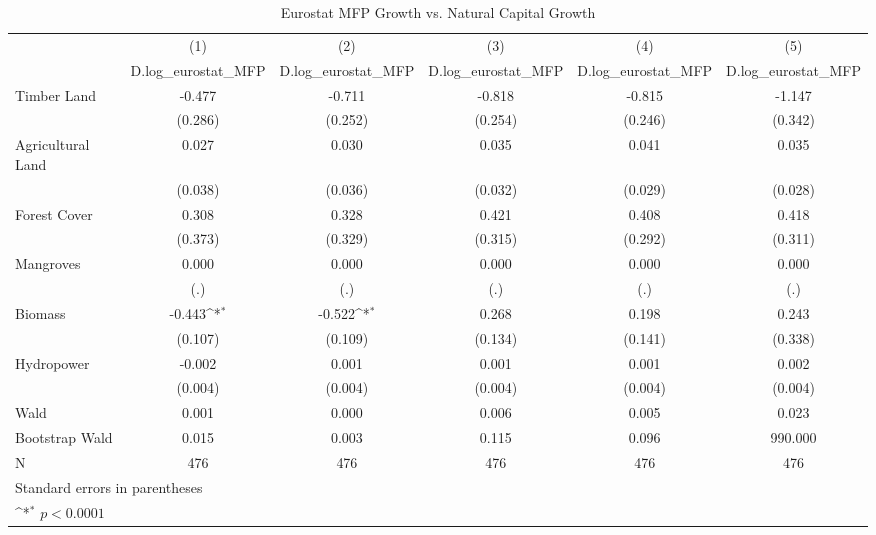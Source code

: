\begin{table}[htbp]\centering
\def\sym#1{\ifmmode^{#1}\else\(^{#1}\)\fi}
\caption{Eurostat MFP Growth vs. Natural Capital Growth}
\begin{tabular}{l*{5}{c}}
\hline\hline
            &\multicolumn{1}{c}{(1)}&\multicolumn{1}{c}{(2)}&\multicolumn{1}{c}{(3)}&\multicolumn{1}{c}{(4)}&\multicolumn{1}{c}{(5)}\\
            &\multicolumn{1}{c}{D.log\_eurostat\_MFP}&\multicolumn{1}{c}{D.log\_eurostat\_MFP}&\multicolumn{1}{c}{D.log\_eurostat\_MFP}&\multicolumn{1}{c}{D.log\_eurostat\_MFP}&\multicolumn{1}{c}{D.log\_eurostat\_MFP}\\
\hline
Timber Land &      -0.477       &      -0.711       &      -0.818       &      -0.815       &      -1.147       \\
            &     (0.286)       &     (0.252)       &     (0.254)       &     (0.246)       &     (0.342)       \\
[1em]
Agricultural Land &       0.027       &       0.030       &       0.035       &       0.041       &       0.035       \\
            &     (0.038)       &     (0.036)       &     (0.032)       &     (0.029)       &     (0.028)       \\
[1em]
Forest Cover &       0.308       &       0.328       &       0.421       &       0.408       &       0.418       \\
            &     (0.373)       &     (0.329)       &     (0.315)       &     (0.292)       &     (0.311)       \\
[1em]
Mangroves &       0.000       &       0.000       &       0.000       &       0.000       &       0.000       \\
            &         (.)       &         (.)       &         (.)       &         (.)       &         (.)       \\
[1em]
Biomass &      -0.443\sym{*}&      -0.522\sym{*}&       0.268       &       0.198       &       0.243       \\
            &     (0.107)       &     (0.109)       &     (0.134)       &     (0.141)       &     (0.338)       \\
[1em]
Hydropower &      -0.002       &       0.001       &       0.001       &       0.001       &       0.002       \\
            &     (0.004)       &     (0.004)       &     (0.004)       &     (0.004)       &     (0.004)       \\
\hline
Wald        &       0.001       &       0.000       &       0.006       &       0.005       &       0.023       \\
Bootstrap Wald&       0.015       &       0.003       &       0.115       &       0.096       &     990.000       \\
N           &         476       &         476       &         476       &         476       &         476       \\
\hline\hline
\multicolumn{6}{l}{\footnotesize Standard errors in parentheses}\\
\multicolumn{6}{l}{\footnotesize \sym{*} \(p<0.0001\)}\\
\end{tabular}
\end{table}
